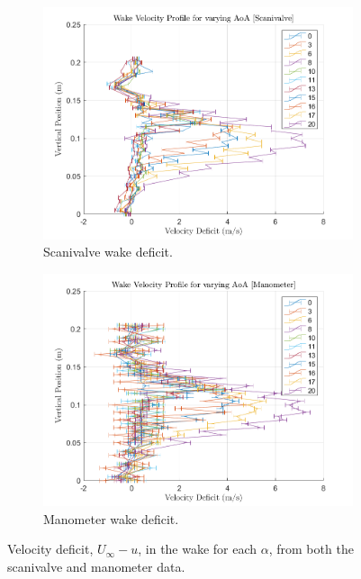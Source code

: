 \documentclass[runningheads]{llncs}
\begin{document}
\begin{figure}
    \centering
    \begin{subfigure}[b]{0.45\textwidth}
         \centering
         \includegraphics[width=\textwidth]{figures/scanivalve_wake_velocities.png}
          \caption{Scanivalve wake deficit.}
         \label{fig:scanivalve_wake_velocity}
     \end{subfigure}
     \begin{subfigure}[b]{0.45\textwidth}
         \centering
         \includegraphics[width=\textwidth]{figures/manometer_wake_velocities.png}
         \caption{Manometer wake deficit.}
         \label{fig:manometer_wake_velocity}
     \end{subfigure}
    \caption{Velocity deficit, $U_\infty - u$, in the wake for each $\alpha$, from both the scanivalve and manometer data.}
    \label{fig:wake_velocities}
\end{figure}
\end{document}
